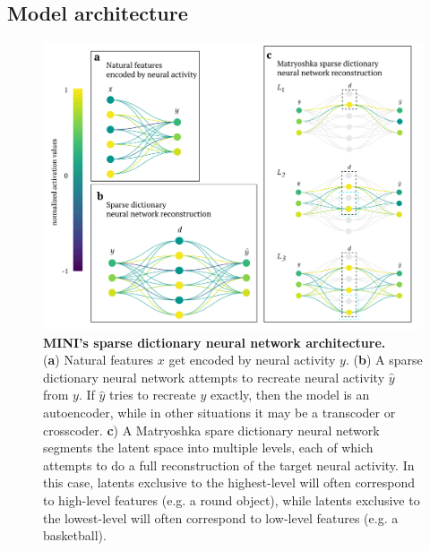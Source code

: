 \subsection{Model architecture}

\begin{figure}[h]
    \centering
    \begin{minipage}{0.63\linewidth}
    \includegraphics[width=\linewidth]{figures/sdnn_arch.pdf}
    \end{minipage}
    \begin{minipage}{0.37\linewidth}
    \caption{
        \textbf{MINI's sparse dictionary neural network architecture.} \\
        \small (\textbf{a}) Natural features $x$ get encoded by neural activity $y$. (\textbf{b}) A sparse dictionary neural network attempts to recreate neural activity $\hat{y}$ from $y$. If $\hat{y}$ tries to recreate $y$ exactly, then the model is an autoencoder, while in other situations it may be a transcoder or crosscoder. \textbf{c}) A Matryoshka spare dictionary neural network segments the latent space into multiple levels, each of which attempts to do a full reconstruction of the target neural activity. In this case, latents exclusive to the highest-level will often correspond to high-level features (e.g. a round object), while latents exclusive to the lowest-level will often correspond to low-level features (e.g. a basketball).
    }
    \label{fig:sdnn_arch}
    \end{minipage}
\end{figure}

